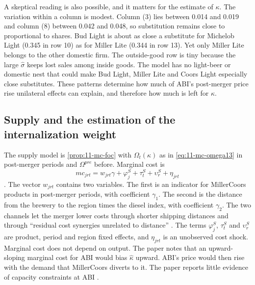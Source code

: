 A skeptical reading is also possible, and it matters for the estimate of $\kappa$. The variation within a column is
modest. Column (3) lies between 0.014 and 0.019 and column (8) between 0.042 and 0.048, so substitution remains close
to proportional to shares. Bud Light is about as close a substitute for Michelob Light (0.345 in row 10) as for
Miller Lite (0.344 in row 13). Yet only Miller Lite belongs to the other domestic firm. The outside-good row is
tiny because the large $\hat\sigma$ keeps lost sales among inside goods. The model has no light-beer or domestic
nest that could make Bud Light, Miller Lite and Coors Light especially close substitutes. These patterns determine
how much of ABI's post-merger price rise unilateral effects can explain, and therefore how much is left for $\kappa$.

\subsection{Supply and the estimation of the internalization weight}\label{sec:11-mc-supply}

The supply model is \cref{prop:11-mc-foc} with $\Omega_t(\kappa)$ as in \eqref{eq:11-mc-omega13} in post-merger periods
and $\Omega^{pre}$ before. Marginal cost is
\begin{equation}\label{eq:11-mc-mc}
  mc_{jrt} = w_{jrt}\gamma + \varphi^S_j + \tau^S_t + \upsilon^S_r + \eta_{jrt}
\end{equation}
\citep[eq.~(11)]{MillerWeinberg2017}. The vector $w_{jrt}$ contains two variables. The first is an indicator for
MillerCoors products in post-merger periods, with coefficient $\gamma_1$. The second is the distance from the brewery
to the region times the diesel index, with coefficient $\gamma_2$. The two channels let the merger lower costs
through shorter shipping distances and through ``residual cost synergies unrelated to distance''
\citep[p.~1779]{MillerWeinberg2017}. The terms $\varphi^S_j$, $\tau^S_t$ and $\upsilon^S_r$ are product, period and
region fixed effects, and $\eta_{jrt}$ is an unobserved cost shock. Marginal cost does not depend on output. The paper
notes that an upward-sloping marginal cost for ABI would bias $\hat\kappa$ upward. ABI's price would then rise with
the demand that MillerCoors diverts to it. The paper reports little evidence of capacity constraints at ABI
\citep[n.~13]{MillerWeinberg2017}.


